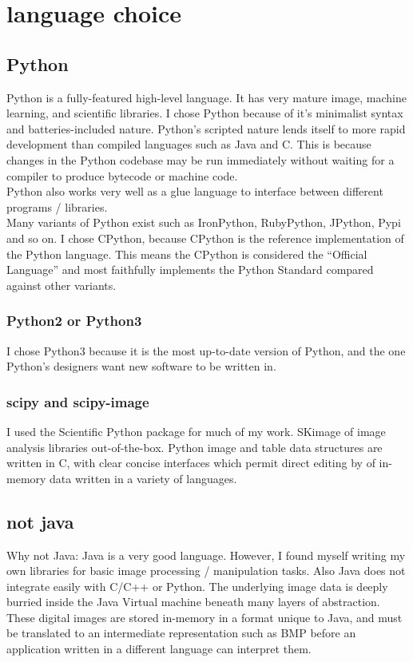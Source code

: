 \chapter{language choice}

\section{Python}
Python is a fully-featured high-level language. It has very mature image, machine learning, and scientific libraries.  I chose Python because of it's minimalist syntax and batteries-included nature.  Python's scripted nature lends itself to more rapid development than compiled languages such as Java and C. This is because changes in the Python codebase may be run immediately without waiting for a compiler to produce bytecode or machine code.\\
Python also works very well as a glue language to interface between different programs / libraries.\\
Many variants of Python exist such as IronPython, RubyPython, JPython, Pypi and so on. I chose CPython, because CPython is the reference implementation of the Python language.  This means the CPython is considered the ``Official Language'' and most faithfully implements the Python Standard compared against other variants.
\subsection{Python2 or Python3}
I chose Python3 because it is the most up-to-date version of Python, and the one Python's designers want new software to be written in.

\subsection{scipy and scipy-image}
I used the Scientific Python package for much of my work. SKimage of image analysis libraries out-of-the-box.  Python image and table data structures are written in C, with clear concise interfaces which permit direct editing by of in-memory data written in a variety of languages.

\section{not java}
Why not Java:  Java is a very good language. However, I found myself writing my own libraries for basic image processing / manipulation tasks.  Also Java does not integrate easily with C/C++ or Python.  The underlying image data is deeply burried inside the Java Virtual machine beneath many layers of abstraction. These digital images are stored in-memory in a format unique to Java, and must be translated to an intermediate representation such as BMP before an application written in a different language can interpret them.

